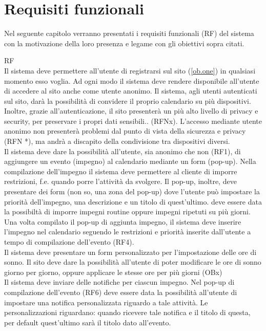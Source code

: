 \section{Requisiti funzionali}
\label{sec:RequisitiFunzionali}

Nel seguente capitolo verranno presentati i requisiti funzionali (RF)
del sistema con la motivazione della loro presenza e legame
con gli obiettivi sopra citati.
\begin {listaPersonale}{RF}
 \\ %
Il sistema deve permettere all'utente di registrarsi sul sito (\ref{ob.one}) in qualsiasi momento esso voglia. Ad ogni modo il sistema deve rendere disponibile all'utente di accedere al sito anche come utente anonimo.
Il sistema, agli utenti autenticati sul sito, darà la possibilità di convidere il proprio calendario su più dispositivi. Inoltre, grazie all'autenticazione, il sito presenterà un più alto livello di privacy e security, per preservare i propri dati sensibili..
(RFNx).
L'accesso mediante utente anonimo non presenterà problemi dal punto di vista della sicurezza e privacy (RFN *), ma andrà a discapito della condivisione tra dispositivi diversi.
 \\
Il sistema deve dare la possibilità all'utente, sia anonimo che non (RF1), di aggiungere un evento (impegno) al calendario mediante un form (pop-up). Nella compilazione dell'impegno il sistema deve permettere al cliente di imporre restrizioni, f.e. quando porre l'attività da svolgere. Il pop-up, inoltre, deve presentare dei form (non so, una zona del pop-up) dove l'utente può impostare la priorità dell'impegno, una descrizione e un titolo di quest'ultimo. deve essere data la possibiltà di imporre impegni routine oppure impegni ripetuti su più giorni.
 \\
Una volta compilato il pop-up di aggiunta impegno, il sistema deve inserire l'impegno nel calendario seguendo le restrizioni e priorità inserite dall'utente a tempo di compilazione dell'evento (RF4).
 \\
Il sistema deve presentare un form personalizzato per l'impostazione delle ore di sonno. Il sito deve dare la possibilità all'utente di poter modificare le ore di sonno giorno per giorno, oppure applicare le stesse ore per più giorni (OBx)
 \\
Il sistema deve inviare delle notifiche per ciascun impegno. Nel pop-up di compilazione dell'evento (RF6) deve essere data la possibilità all'utente di impostare una notifica personalizzata riguardo a tale attività. Le personalizzazioni riguardano: quando ricevere tale notifica e il titolo di questa, per default quest'ultimo sarà il titolo dato all'evento.

\end{listaPersonale}
